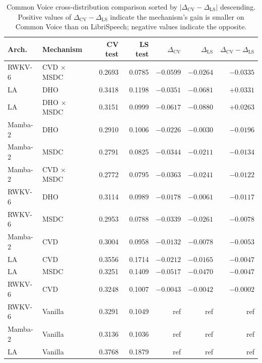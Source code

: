 \begin{table}[!htbp]
\centering
\small
\caption[Common Voice cross-distribution comparison]{Common Voice
cross-distribution comparison sorted by
$|\Delta_{\mathrm{CV}} - \Delta_{\mathrm{LS}}|$ descending. Positive
values of $\Delta_{\mathrm{CV}} - \Delta_{\mathrm{LS}}$ indicate the
mechanism's gain is smaller on Common Voice than on LibriSpeech;
negative values indicate the opposite.}
\label{tab:results:cv-cross}
\setlength{\tabcolsep}{4pt}
\renewcommand{\arraystretch}{1.15}
\begin{tabularx}{\linewidth}{@{}p{1.7cm} X r r r r r@{}}
\toprule
\textbf{Arch.} & \textbf{Mechanism} &
\textbf{CV test} & \textbf{LS test} &
\textbf{$\Delta_{\mathrm{CV}}$} & \textbf{$\Delta_{\mathrm{LS}}$} &
\textbf{$\Delta_{\mathrm{CV}} - \Delta_{\mathrm{LS}}$} \\
\midrule
RWKV-6  & CVD $\times$ MSDC & 0.2693 & 0.0785 & $-0.0599$ & $-0.0264$ & $-0.0335$ \\
LA      & DHO               & 0.3418 & 0.1198 & $-0.0351$ & $-0.0681$ & $+0.0331$ \\
LA      & DHO $\times$ MSDC & 0.3151 & 0.0999 & $-0.0617$ & $-0.0880$ & $+0.0263$ \\
Mamba-2 & DHO               & 0.2910 & 0.1006 & $-0.0226$ & $-0.0030$ & $-0.0196$ \\
Mamba-2 & MSDC              & 0.2791 & 0.0825 & $-0.0344$ & $-0.0211$ & $-0.0134$ \\
Mamba-2 & CVD $\times$ MSDC & 0.2772 & 0.0795 & $-0.0363$ & $-0.0241$ & $-0.0122$ \\
RWKV-6  & DHO               & 0.3114 & 0.0989 & $-0.0178$ & $-0.0061$ & $-0.0117$ \\
RWKV-6  & MSDC              & 0.2953 & 0.0788 & $-0.0339$ & $-0.0261$ & $-0.0078$ \\
Mamba-2 & CVD               & 0.3004 & 0.0958 & $-0.0132$ & $-0.0078$ & $-0.0053$ \\
LA      & CVD               & 0.3556 & 0.1714 & $-0.0212$ & $-0.0165$ & $-0.0047$ \\
LA      & MSDC              & 0.3251 & 0.1409 & $-0.0517$ & $-0.0470$ & $-0.0047$ \\
RWKV-6  & CVD               & 0.3248 & 0.1007 & $-0.0043$ & $-0.0042$ & $-0.0002$ \\
RWKV-6  & Vanilla           & 0.3291 & 0.1049 & ref       & ref       & ref \\
Mamba-2 & Vanilla           & 0.3136 & 0.1036 & ref       & ref       & ref \\
LA      & Vanilla           & 0.3768 & 0.1879 & ref       & ref       & ref \\
\bottomrule
\end{tabularx}
\end{table}

